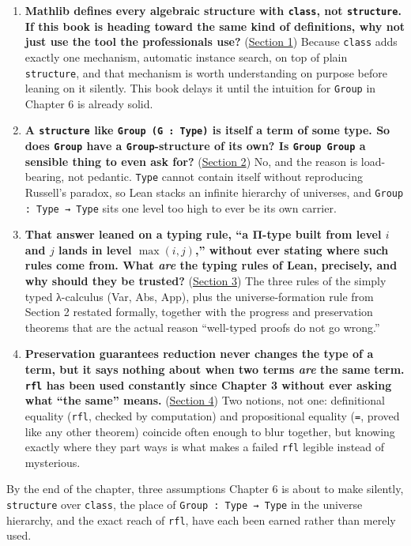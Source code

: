 \begin{enumerate}
\def\labelenumi{\arabic{enumi}.}
\tightlist
\item
  \textbf{Mathlib defines every algebraic structure with \texttt{class}, not \texttt{structure}. If this book is heading toward the same kind of definitions, why not just use the tool the professionals use?} (\hyperref[sec:05-rigor-check:01-structure-vs-class:1]{Section 1}) Because \texttt{class} adds exactly one mechanism, automatic instance search, on top of plain \texttt{structure}, and that mechanism is worth understanding on purpose before leaning on it silently. This book delays it until the intuition for \texttt{Group} in Chapter 6 is already solid.
\item
  \textbf{A \texttt{structure} like \texttt{Group (G : Type)} is itself a term of some type. So does \texttt{Group} have a \texttt{Group}-structure of its own? Is \texttt{Group Group} a sensible thing to even ask for?} (\hyperref[sec:05-rigor-check:02-universes:1]{Section 2}) No, and the reason is load-bearing, not pedantic. \texttt{Type} cannot contain itself without reproducing Russell's paradox, so Lean stacks an infinite hierarchy of universes, and \texttt{Group : Type → Type} sits one level too high to ever be its own carrier.
\item
  \textbf{That answer leaned on a typing rule, ``a Π-type built from level \(i\) and \(j\) lands in level \(\max(i,j)\),'' without ever stating where such rules come from. What \emph{are} the typing rules of Lean, precisely, and why should they be trusted?} (\hyperref[sec:05-rigor-check:03-typing-rules-and-safety:1]{Section 3}) The three rules of the simply typed λ-calculus (Var, Abs, App), plus the universe-formation rule from Section 2 restated formally, together with the progress and preservation theorems that are the actual reason ``well-typed proofs do not go wrong.''
\item
  \textbf{Preservation guarantees reduction never changes the type of a term, but it says nothing about when two terms \emph{are} the same term. \texttt{rfl} has been used constantly since Chapter 3 without ever asking what ``the same'' means.} (\hyperref[sec:05-rigor-check:04-defeq-vs-propeq:1]{Section 4}) Two notions, not one: definitional equality (\texttt{rfl}, checked by computation) and propositional equality (\texttt{=}, proved like any other theorem) coincide often enough to blur together, but knowing exactly where they part ways is what makes a failed \texttt{rfl} legible instead of mysterious.
\end{enumerate}

By the end of the chapter, three assumptions Chapter 6 is about to make silently, \texttt{structure} over \texttt{class}, the place of \texttt{Group : Type → Type} in the universe hierarchy, and the exact reach of \texttt{rfl}, have each been earned rather than merely used.








